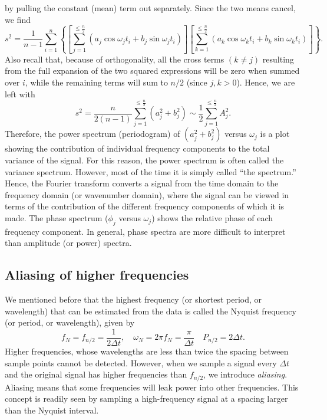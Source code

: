 by pulling the constant (mean) term out separately.  Since the two means cancel, we find
\begin{equation}
s^2 = \frac{1}{n-1}  \sum^n_{i=1} \left \{ \left [ \sum_{j=1} ^{\leq \frac{n}{2}} \left (a_j \cos \omega_{j} t_i + b_j \sin \omega_{j} t_i \right ) \right ] \left [ \sum_{k=1} ^{\leq \frac{n}{2}} \left (a_k \cos \omega_{k} t_i + b_k \sin \omega_{k} t_i \right ) \right ] \right \}.
\end{equation}
Also recall that, because of orthogonality, all the cross terms $(k \neq j)$ resulting from the full expansion 
of the two squared expressions will be zero when summed over $i$, while the remaining terms will sum to $n/2$ (since $j,k > 0$).
Hence, we are left with
\begin{equation}
s^2 = \frac{n}{2(n-1)} \sum_{j=1} ^{\leq \frac{n}{2}} (a^2_j + b^2_j) \sim \frac{1}{2}\sum_{j=1} ^{\leq \frac{n}{2}} A^2_j.
\end{equation}
Therefore, the power spectrum (periodogram) of $(a_j^2 + b_j^2)$ versus $\omega_j$ is a plot showing the 
contribution of individual frequency components to the total variance of the signal.  For this reason, 
the power spectrum is often called the variance spectrum.  However, most of the time it is simply called ``the 
spectrum.''  Hence, the Fourier transform converts a signal from the time domain to the frequency 
domain (or wavenumber domain), where the signal can be viewed in terms of the contribution of 
the different frequency components of which it is made.  The phase spectrum ($\phi_j$ versus $\omega_j$)
shows the relative phase of each frequency component.  In general, phase spectra are more difficult
to interpret than amplitude (or power) spectra.

\subsection{Aliasing of higher frequencies}
	We mentioned before that the highest frequency (or shortest period, or wavelength) that can be 
estimated from the data is called the Nyquist frequency (or period, or wavelength), given by
\begin{equation}
f_N = f_{n/2} = \frac{1}{2\Delta t}, \quad \omega_N = 2\pi f_N = \frac{\pi}{\Delta t}\quad P_{n/2} = 2 \Delta t.
\end{equation}
Higher frequencies, whose wavelengths are less than twice the spacing between sample points 
cannot be detected.  However, when we sample a signal every $\Delta t$ and the original signal has 
higher frequencies than $f_{n/2}$, we introduce \emph{aliasing}.  Aliasing means that some frequencies will 
leak power into other frequencies.  This concept is readily seen by sampling a high-frequency 
signal at a spacing larger than the Nyquist interval.

